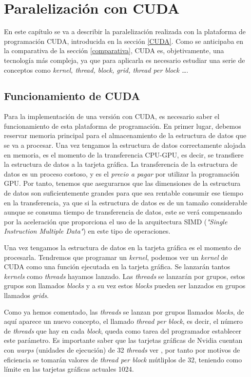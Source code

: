 \chapter{Paralelización con CUDA}

En este capítulo se va a describir la paralelización realizada con la plataforma de programación CUDA, introducida en la sección \ref{CUDA}. Como se anticipaba en la comparativa de la sección \ref{comparativa}, CUDA es, objetivamente, una tecnología más compleja, ya que para aplicarla es necesario estudiar una serie de conceptos como \textit{kernel, thread, block, grid, thread per block \dots }. 

\section{Funcionamiento de CUDA}
\label{FuncionamientoCUDA}
Para la implementación de una versión con CUDA, es necesario saber el funcionamiento de esta plataforma de programación. En primer lugar, debemos reservar memoria principal para el almacenamiento de la estructura de datos que se va a procesar. Una vez tengamos la estructura de datos correctamente alojada en memoria, es el momento de la transferencia CPU-GPU, es decir, se transfiere la estructura de datos a la tarjeta gráfica. La transferencia de la estructura de datos es un proceso costoso, y es el \textit{precio a pagar} por utilizar la programación GPU. Por tanto, tenemos que asegurarnos que las dimensiones de la estructura de datos son suficientemente grandes para que sea rentable consumir ese tiempo en la transferencia, ya que si la estructura de datos es de un tamaño considerable aunque se consuma tiempo de transferencia de datos, este se verá compensando por la aceleración que proporciona el uso de la arquitectura SIMD (\textit{"Single Instruction Multiple Data"}) en este tipo de operaciones.

Una vez tengamos la estructura de datos en la tarjeta gráfica es el momento de procesarla. Tendremos que programar un \textit{kernel}, podemos ver un \textit{kernel} de CUDA como una función ejecutada en la tarjeta gráfica. Se lanzarán tantos \textit{kernels} como \textit{threads} hayamos lanzado. Las \textit{threads} se lanzarán por grupos, estos grupos son llamados \textit{blocks} y a su vez estos \textit{blocks} pueden ser lanzados en grupos llamados \textit{grids}.

Como ya hemos comentado, las \textit{threads} se lanzan por grupos llamados \textit{blocks}, de aquí aparece un nuevo concepto, el llamado \textit{thread per block}, es decir, el número de \textit{threads} que hay en cada \textit{block}, queda como tarea del programador establecer este parámetro. Es importante saber que las tarjetas gráficas de Nvidia cuentan con \textit{warps} (unidades de ejecución) de 32 \textit{threads} ver \cite{unknown-author-2021G}, por tanto por motivos de eficiencia se tomarán valores de \textit{thread per block} mútliplos de 32, teniendo como límite en las tarjetas gráficas actuales 1024. 

